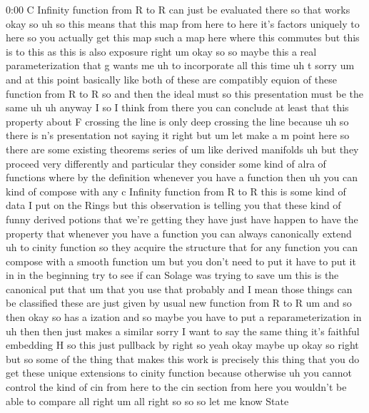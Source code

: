 \begin{unfinished}{0:00}
C  Infinity  function  from  R  to  R  can  just
be  evaluated  there  so  that
works
okay  so
uh  so  this  means  that
this  map  from  here  to  here  it's  factors
uniquely  to  here  so  you  actually  get
this  map  such  a  map
here  where  this
commutes  but  this  is  to  this  as  this  is
also  exposure
right
um  okay  so  so  maybe  this  a  real
parameterization  that  g  wants  me  uh  to
incorporate  all  this
time  uh
t
sorry
um
and  at  this  point  basically  like  both  of
these  are  compatibly  equion  of  these
function  from  R  to  R  so  and  then  the
ideal  must  so  this  presentation  must  be
the  same
uh
uh
anyway
I  so  I  think  from  there  you  can  conclude
at  least  that  this  property  about  F
crossing  the  line  is  only  deep  crossing
the  line  because  uh  so  there  is  n's
presentation  not  saying  it  right  but  um
let  make  a  m  point  here  so  there  are
some  existing  theorems  series  of  um  like
derived  manifolds  uh  but  they  proceed
very  differently  and  particular  they
consider  some  kind  of  alra  of  functions
where  by  the  definition  whenever  you
have  a  function  then  uh  you  can  kind  of
compose  with  any  c  Infinity  function
from  R  to  R  this  is  some  kind  of  data  I
put  on  the  Rings  but  this  observation  is
telling  you  that  these  kind  of  funny
derived  potions  that  we're  getting  they
have  just  have
happen  to  have  the  property  that
whenever  you  have  a  function  you  can
always  canonically  extend  uh  to  cinity
function
so  they  acquire  the  structure  that  for
any  function  you  can  compose  with  a
smooth
function  um  but  you  don't  need  to  put  it
have  to  put  it  in  in  the
beginning
try  to  see  if  can  Solage  was  trying  to
save
um
this  is  the
canonical  put  that
um  that  you  use  that  probably  and  I  mean
those  things  can  be  classified  these  are
just  given  by  usual  new  function  from  R
to
R  um  and  so  then  okay  so  has  a  ization
and  so  maybe  you  have  to  put  a
reparameterization  in  uh  then  then  just
makes  a
similar  sorry  I  want  to  say  the  same
thing  it's  faithful
embedding
H  so  this  just  pullback  by  right  so  yeah
okay  maybe
up
okay
so  right  but  so  some  of  the  thing  that
makes  this  work  is  precisely  this  thing
that  you  do  get  these  unique  extensions
to  cinity  function  because
otherwise  uh  you  cannot  control  the  kind
of  cin  from  here  to  the  cin  section  from
here  you  wouldn't  be  able  to  compare
all  right
um  all  right  so  so  so  let  me  know  State

\end{unfinished}

